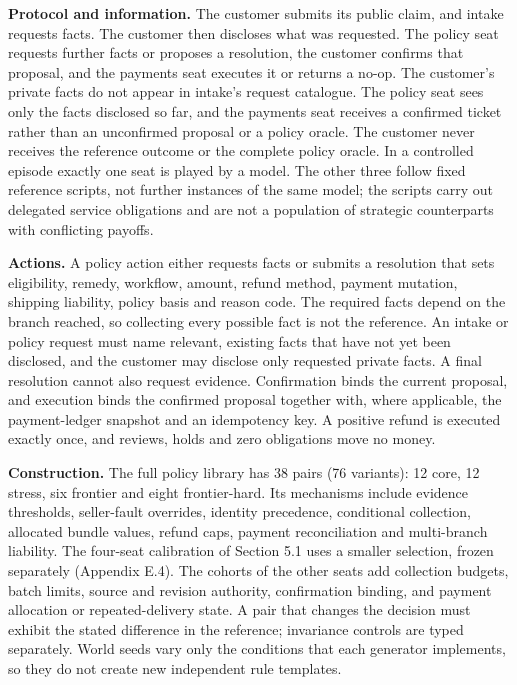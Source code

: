 \textbf{Protocol and information.} The customer submits its public claim, and intake requests facts. The customer then
discloses what was requested. The policy seat requests further facts or proposes a resolution, the customer confirms
that proposal, and the payments seat executes it or returns a no-op. The customer's private facts do not appear in
intake's request catalogue. The policy seat sees only the facts disclosed so far, and the payments seat receives a
confirmed ticket rather than an unconfirmed proposal or a policy oracle. The customer never receives the reference
outcome or the complete policy oracle. In a controlled episode exactly one seat is played by a model. The other three
follow fixed reference scripts, not further instances of the same model; the scripts carry out delegated service
obligations and are not a population of strategic counterparts with conflicting payoffs.

\textbf{Actions.} A policy action either requests facts or submits a resolution that sets eligibility, remedy, workflow,
amount, refund method, payment mutation, shipping liability, policy basis and reason code. The required facts depend
on the branch reached, so collecting every possible fact is not the reference. An intake or policy request must name
relevant, existing facts that have not yet been disclosed, and the customer may disclose only requested private facts.
A final resolution cannot also request evidence. Confirmation binds the current proposal, and execution binds the
confirmed proposal together with, where applicable, the payment-ledger snapshot and an idempotency key. A positive
refund is executed exactly once, and reviews, holds and zero obligations move no money.

\textbf{Construction.} The full policy library has 38 pairs (76 variants): 12 core, 12 stress, six frontier and eight
frontier-hard. Its mechanisms include evidence thresholds, seller-fault overrides, identity precedence, conditional
collection, allocated bundle values, refund caps, payment reconciliation and multi-branch liability. The four-seat
calibration of Section 5.1 uses a smaller selection, frozen separately (Appendix E.4). The cohorts of the other seats
add collection budgets, batch limits, source and revision authority, confirmation binding, and payment allocation or
repeated-delivery state. A pair that changes the decision must exhibit the stated difference in the reference;
invariance controls are typed separately. World seeds vary only the conditions that each generator implements, so
they do not create new independent rule templates.


